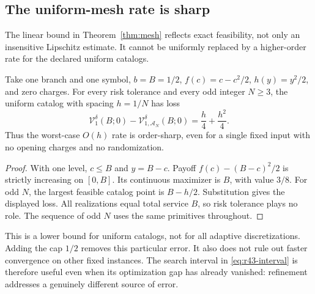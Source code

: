 \subsection{The uniform-mesh rate is sharp}\label{sec:r43-sharpness}
The linear bound in Theorem~\ref{thm:mesh} reflects exact feasibility, not only an insensitive Lipschitz estimate. It cannot be uniformly replaced by a higher-order rate for the declared uniform catalogs.
\begin{proposition}\label{prop:r43-sharp}
Take one branch and one symbol, $b=B=1/2$, $f(c)=c-c^2/2$, $h(y)=y^2/2$, and zero charges. For every risk tolerance and every odd integer $N\geq3$, the uniform catalog with spacing $h=1/N$ has loss
\[
 \mathcal V_1^\delta(B;0)-\mathcal V_{1,\mathcal A_N}^\delta(B;0)
 =\frac h4+\frac{h^2}4.
\]
Thus the worst-case $O(h)$ rate is order-sharp, even for a single fixed input with no opening charges and no randomization.
\end{proposition}
\begin{proof}
With one level, $c\leq B$ and $y=B-c$. Payoff $f(c)-(B-c)^2/2$ is strictly increasing on $[0,B]$. Its continuous maximizer is $B$, with value $3/8$. For odd $N$, the largest feasible catalog point is $B-h/2$. Substitution gives the displayed loss. All realizations equal total service $B$, so risk tolerance plays no role. The sequence of odd $N$ uses the same primitives throughout.
\end{proof}
This is a lower bound for uniform catalogs, not for all adaptive discretizations. Adding the cap $1/2$ removes this particular error. It also does not rule out faster convergence on other fixed instances. The search interval in \eqref{eq:r43-interval} is therefore useful even when its optimization gap has already vanished: refinement addresses a genuinely different source of error.
